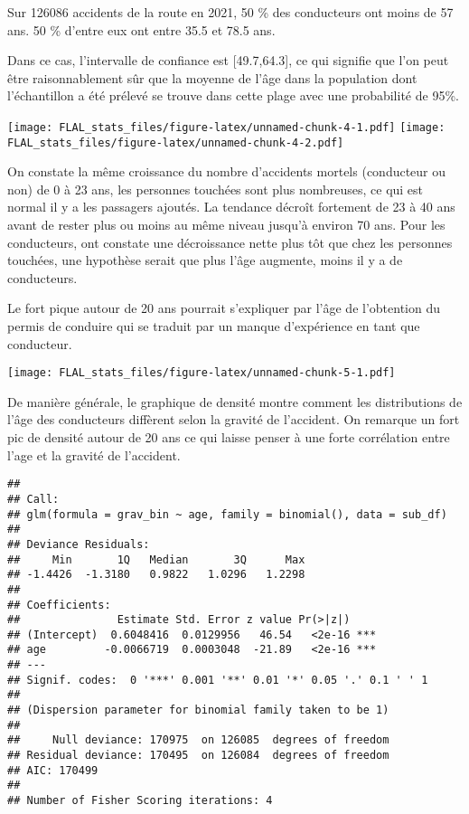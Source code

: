 \documentclass[
]{article}
\begin{document}
Sur 126086 accidents de la route en 2021, 50 \% des conducteurs ont
moins de 57 ans. 50 \% d'entre eux ont entre 35.5 et 78.5 ans.

Dans ce cas, l'intervalle de confiance est {[}49.7,64.3{]}, ce qui
signifie que l'on peut être raisonnablement sûr que la moyenne de l'âge
dans la population dont l'échantillon a été prélevé se trouve dans cette
plage avec une probabilité de 95\%.

\texttt{[image: FLAL\_stats\_files/figure-latex/unnamed-chunk-4-1.pdf]}
\texttt{[image: FLAL\_stats\_files/figure-latex/unnamed-chunk-4-2.pdf]}

On constate la même croissance du nombre d'accidents mortels (conducteur
ou non) de 0 à 23 ans, les personnes touchées sont plus nombreuses, ce
qui est normal il y a les passagers ajoutés. La tendance décroît
fortement de 23 à 40 ans avant de rester plus ou moins au même niveau
jusqu'à environ 70 ans. Pour les conducteurs, ont constate une
décroissance nette plus tôt que chez les personnes touchées, une
hypothèse serait que plus l'âge augmente, moins il y a de conducteurs.

Le fort pique autour de 20 ans pourrait s'expliquer par l'âge de
l'obtention du permis de conduire qui se traduit par un manque
d'expérience en tant que conducteur.

\texttt{[image: FLAL\_stats\_files/figure-latex/unnamed-chunk-5-1.pdf]}

De manière générale, le graphique de densité montre comment les
distributions de l'âge des conducteurs diffèrent selon la gravité de
l'accident. On remarque un fort pic de densité autour de 20 ans ce qui
laisse penser à une forte corrélation entre l'age et la gravité de
l'accident.

\begin{verbatim}
## 
## Call:
## glm(formula = grav_bin ~ age, family = binomial(), data = sub_df)
## 
## Deviance Residuals: 
##     Min       1Q   Median       3Q      Max  
## -1.4426  -1.3180   0.9822   1.0296   1.2298  
## 
## Coefficients:
##               Estimate Std. Error z value Pr(>|z|)    
## (Intercept)  0.6048416  0.0129956   46.54   <2e-16 ***
## age         -0.0066719  0.0003048  -21.89   <2e-16 ***
## ---
## Signif. codes:  0 '***' 0.001 '**' 0.01 '*' 0.05 '.' 0.1 ' ' 1
## 
## (Dispersion parameter for binomial family taken to be 1)
## 
##     Null deviance: 170975  on 126085  degrees of freedom
## Residual deviance: 170495  on 126084  degrees of freedom
## AIC: 170499
## 
## Number of Fisher Scoring iterations: 4
\end{verbatim}
\end{document}
